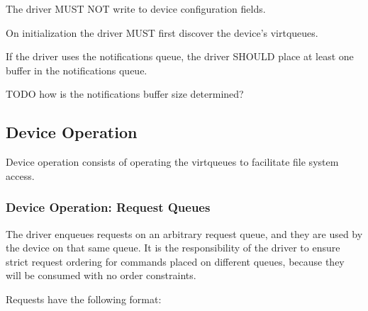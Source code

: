 
The driver MUST NOT write to device configuration fields.



On initialization the driver MUST first discover the
device's virtqueues.

If the driver uses the notifications queue, the driver SHOULD place at least
one buffer in the notifications queue.

TODO how is the notifications buffer size determined?

\subsection{Device Operation}\label{sec:Device Types / File System Device / Device Operation}

Device operation consists of operating the virtqueues to facilitate file system
access.

\subsubsection{Device Operation: Request Queues}\label{sec:Device Types / File System Device / Device Operation / Device Operation: Request Queues}

The driver enqueues requests on an arbitrary request queue, and
they are used by the device on that same queue. It is the
responsibility of the driver to ensure strict request ordering
for commands placed on different queues, because they will be
consumed with no order constraints.

Requests have the following format:

